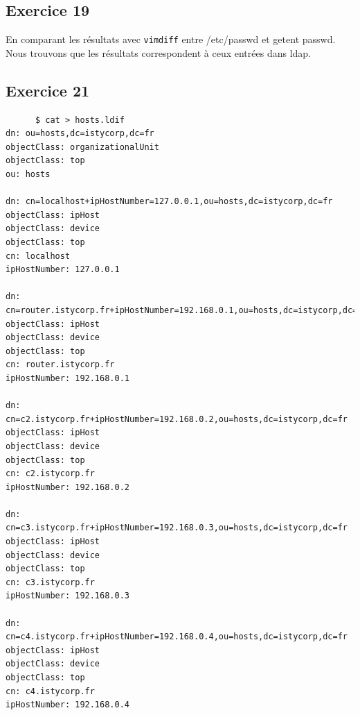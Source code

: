 \documentclass{report}
\begin{document}
\subsection{Exercice 19}
En comparant les résultats avec \texttt{vimdiff} entre /etc/passwd et getent passwd.
Nous trouvons que les résultats correspondent à ceux entrées dans ldap.
\subsection{Exercice 21}

\begin{tcolorbox}
  \begin{verbatim}
      $ cat > hosts.ldif
dn: ou=hosts,dc=istycorp,dc=fr
objectClass: organizationalUnit
objectClass: top
ou: hosts

dn: cn=localhost+ipHostNumber=127.0.0.1,ou=hosts,dc=istycorp,dc=fr
objectClass: ipHost
objectClass: device
objectClass: top
cn: localhost
ipHostNumber: 127.0.0.1

dn: cn=router.istycorp.fr+ipHostNumber=192.168.0.1,ou=hosts,dc=istycorp,dc=fr
objectClass: ipHost
objectClass: device
objectClass: top
cn: router.istycorp.fr
ipHostNumber: 192.168.0.1

dn: cn=c2.istycorp.fr+ipHostNumber=192.168.0.2,ou=hosts,dc=istycorp,dc=fr
objectClass: ipHost
objectClass: device
objectClass: top
cn: c2.istycorp.fr
ipHostNumber: 192.168.0.2

dn: cn=c3.istycorp.fr+ipHostNumber=192.168.0.3,ou=hosts,dc=istycorp,dc=fr
objectClass: ipHost
objectClass: device
objectClass: top
cn: c3.istycorp.fr
ipHostNumber: 192.168.0.3

dn: cn=c4.istycorp.fr+ipHostNumber=192.168.0.4,ou=hosts,dc=istycorp,dc=fr
objectClass: ipHost
objectClass: device
objectClass: top
cn: c4.istycorp.fr
ipHostNumber: 192.168.0.4
    \end{verbatim}
\end{tcolorbox}
\newpage
\end{document}
